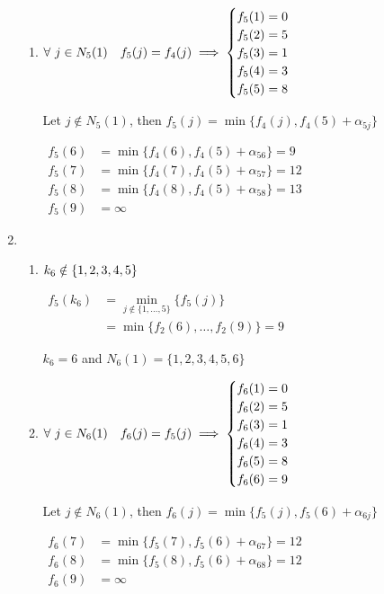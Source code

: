 \begin{prob}
\begin{sol}
\begin{enumerate}[label = {$\underline{i =\arabic*:}$}]
\begin{enumerate}[start = 1, label = {\protect\trc{$\mathbf{S_{\arabic*}}$}}]
    \item $\forall \ j\in N_5(1)\quad f_5(j)=f_4(j)\implies \begin{cases} f_5(1)=0 \\ f_5(2)=5 \\ f_5(3)=1 \\ f_5(4)=3 \\ f_5(5)=8 \end{cases}$
    
    Let $j\notin N_5(1)$, then $f_5(j)=\min\{f_4(j),f_4(5)+\alpha_{5j}\}$
    
    $\begin{aligned}
    f_5(6) &= \min\{f_4(6), f_4(5) + \alpha_{56}\}=9 \\
    f_5(7) &= \min\{f_4(7), f_4(5) + \alpha_{57}\}=12 \\
    f_5(8) &= \min\{f_4(8), f_4(5) + \alpha_{58}\}=13 \\
    f_5(9) &= \infty 
    \end{aligned}$
    \end{enumerate}
    
    
    \item \hspace{0.1cm} \\
    \begin{enumerate}[start = 1, label = {\protect\trc{$\mathbf{S_{\arabic*}}$}}]
    \item $k_6\notin\left\{1,2,3,4,5\right\}$
    
    $\begin{aligned}
    f_5(k_6) &= \min\limits_{j\notin\{1,\dots,5\}}\{f_5(j)\} \\
             &= \min\{f_2(6),\dots,f_2(9)\}=9
    \end{aligned}$
    
    \imp $k_6=6$ and $N_6(1)=\{1,2,3,4,5,6\}$
    
    \item $\forall \ j\in N_6(1)\quad f_6(j)=f_5(j)\implies \begin{cases} f_6(1)=0 \\ f_6(2)=5 \\ f_6(3)=1 \\ f_6(4)=3 \\ f_6(5)=8 \\ f_6(6)=9 \end{cases}$
    
    Let $j\notin N_6(1)$, then $f_6(j)=\min\{f_5(j),f_5(6)+\alpha_{6j}\}$
    
    $\begin{aligned}
    f_6(7) &= \min\{f_5(7), f_5(6) + \alpha_{67}\}=12 \\
    f_6(8) &= \min\{f_5(8), f_5(6) + \alpha_{68}\}=12 \\
    f_6(9) &= \infty 
    \end{aligned}$
    \end{enumerate}
    

\end{enumerate}
\end{sol}
\end{prob}
